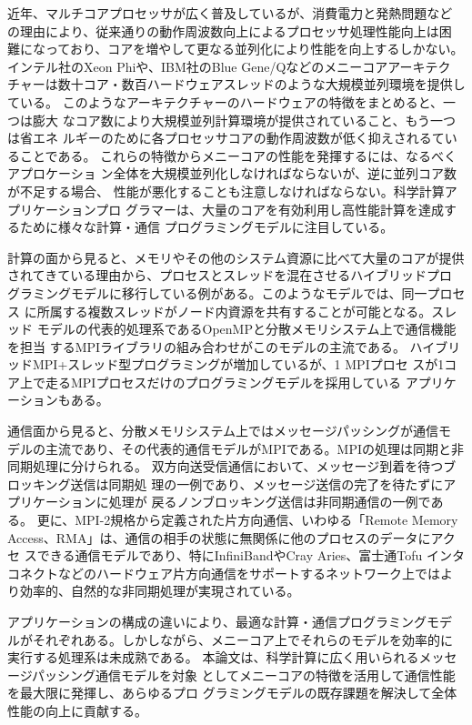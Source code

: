 近年、マルチコアプロセッサが広く普及しているが、消費電力と発熱問題など
の理由により、従来通りの動作周波数向上によるプロセッサ処理性能向上は困
難になっており、コアを増やして更なる並列化により性能を向上するしかない。
インテル社のXeon Phiや、IBM社のBlue Gene/Qなどのメニーコアアーキテク
チャーは数十コア・数百ハードウェアスレッドのような大規模並列環境を提供している。
このようなアーキテクチャーのハードウェアの特徴をまとめると、一つは膨大
なコア数により大規模並列計算環境が提供されていること、もう一つは省エネ
ルギーのために各プロセッサコアの動作周波数が低く抑えされるていることである。
これらの特徴からメニーコアの性能を発揮するには、なるべくアプロケーショ
ン全体を大規模並列化しなければならないが、逆に並列コア数が不足する場合、
性能が悪化することも注意しなければならない。科学計算アプリケーションプロ
グラマーは、大量のコアを有効利用し高性能計算を達成するために様々な計算・通信
プログラミングモデルに注目している。

計算の面から見ると、メモリやその他のシステム資源に比べて大量のコアが提供
されてきている理由から、プロセスとスレッドを混在させるハイブリッドプロ
グラミングモデルに移行している例がある。このようなモデルでは、同一プロセス
に所属する複数スレッドがノード内資源を共有することが可能となる。スレッド
モデルの代表的処理系であるOpenMPと分散メモリシステム上で通信機能を担当
するMPIライブラリの組み合わせがこのモデルの主流である。
ハイブリッドMPI+スレッド型プログラミングが増加しているが、1 MPIプロセ
スが1コア上で走るMPIプロセスだけのプログラミングモデルを採用している
アプリケーションもある。

通信面から見ると、分散メモリシステム上ではメッセージパッシングが通信モ
デルの主流であり、その代表的通信モデルがMPIである。MPIの処理は同期と非同期処理に分けられる。
双方向送受信通信において、メッセージ到着を待つブロッキング送信は同期処
理の一例であり、メッセージ送信の完了を待たずにアプリケーションに処理が
戻るノンブロッキング送信は非同期通信の一例である。
更に、MPI-2規格から定義された片方向通信、いわゆる「Remote Memory
Access、RMA」は、通信の相手の状態に無関係に他のプロセスのデータにアクセ
スできる通信モデルであり、特にInfiniBandやCray Aries、富士通Tofu インタ
コネクトなどのハードウェア片方向通信をサポートするネットワーク上ではよ
り効率的、自然的な非同期処理が実現されている。

アプリケーションの構成の違いにより、最適な計算・通信プログラミングモデ
ルがそれぞれある。しかしながら、メニーコア上でそれらのモデルを効率的に
実行する処理系は未成熟である。
本論文は、科学計算に広く用いられるメッセージパッシング通信モデルを対象
としてメニーコアの特徴を活用して通信性能を最大限に発揮し、あらゆるプロ
グラミングモデルの既存課題を解決して全体性能の向上に貢献する。

